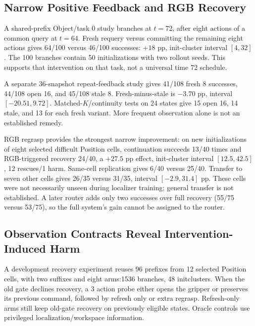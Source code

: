 \documentclass{article}
\begin{document}
\subsection{Narrow Positive Feedback and RGB Recovery}
A shared-prefix Object/task 0 study branches at $t=72$, after eight actions
of a common query at $t=64$. Fresh requery versus committing the remaining
eight actions gives 64/100 versus 46/100 successes:
$+18$ pp, init-cluster interval $[4,32]$. The 100 branches contain 50 initializations
with two rollout seeds. This supports that intervention on that task,
not a universal time 72 schedule.

A separate 36-snapshot repeat-feedback study gives 41/108 fresh 8 successes,
44/108 open 16, and 45/108 stale 8. Fresh-minus-stale is $-3.70$ pp,
interval $[-20.51,9.72]$. Matched-$K$/continuity tests on 24 states give 15 open 16,
14 stale, and 13 for each fresh variant. More frequent observation alone is
not an established remedy.

RGB regrasp provides the strongest narrow improvement: on new initializations
of eight selected difficult Position cells, continuation succeeds 13/40 times
and RGB-triggered recovery 24/40, a $+27.5$ pp effect,
init-cluster interval $[12.5,42.5]$, 12 rescues/1 harm. Same-cell replication gives
6/40 versus 25/40. Transfer to seven other cells gives 26/35 versus 31/35,
interval $[-2.9,31.4]$ pp. These cells were not necessarily unseen during
localizer training; general transfer is not established.
A later router adds only two successes over full recovery (55/75 versus 53/75),
so the full system's gain cannot be assigned to the router.

\subsection{Observation Contracts Reveal Intervention-Induced Harm}
A development recovery experiment reuses 96 prefixes from 12 selected Position cells,
with two suffixes and eight arms:1536 branches, 48 initclusters.
When the old gate declines recovery, a 3 action probe either opens the gripper
or preserves its previous command, followed by refresh only or extra regrasp.
Refresh-only arms still keep old-gate recovery on previously eligible states.
Oracle controls use privileged localization/workspace information.

\begin{table}[t]
\caption{Observation-contract outcomes. Drops are a local proxy, not official
LIBERO-Safety. These branches share 96 prefixes and 48 initclusters.}
\label{tab:observation}
\centering\small
\end{table}
\end{document}
